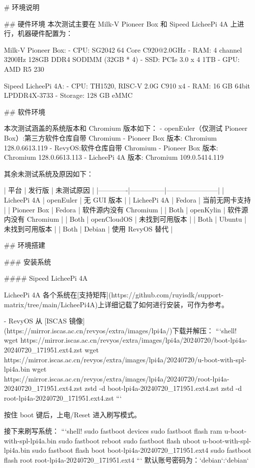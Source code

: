 \documentclass{article}
\begin{document}
\begin{markdown}
# 环境说明

## 硬件环境
本次测试主要在 Milk-V Pioneer Box 和 Sipeed LicheePi 4A 上进行，机器硬件配置为：

Milk-V Pioneer Box:
- CPU: SG2042 64 Core C920@2.0GHz
- RAM: 4 channel 3200Hz 128GB DDR4 SODIMM (32GB * 4)
- SSD: PCIe 3.0 x 4 1TB
- GPU: AMD R5 230

Sipeed LicheePi 4A:
- CPU: TH1520, RISC-V 2.0G C910 x4
- RAM: 16 GB 64bit LPDDR4X-3733
- Storage: 128 GB eMMC

## 软件环境

本次测试涵盖的系统版本和 Chromium 版本如下：
- openEuler（仅测试 Pioneer Box）:第三方软件仓库自带 Chromium 
  - Pioneer Box 版本: Chromium 128.0.6613.119
- RevyOS:软件仓库自带 Chromium
  - Pioneer Box 版本: Chromium 128.0.6613.113
  - LicheePi 4A 版本: Chromium 109.0.5414.119
  
其余未测试系统及原因如下：

| 平台        | 发行版        | 未测试原因              |
|-------------|---------------|-----------------------|
| LicheePi 4A | openEuler     | 无 GUI 版本           |
| LicheePi 4A | Fedora        | 当前无网卡支持        |
| Pioneer Box | Fedora        | 软件源内没有 Chromium |
| Both        | openKylin     | 软件源内没有 Chromium |
| Both        | openCloudOS   | 未找到可用版本        |
| Both        | Ubuntu        | 未找到可用版本        |
| Both        | Debian | 使用 RevyOS 替代      |

## 环境搭建

### 安装系统

#### Sipeed LicheePi 4A

LicheePi 4A 各个系统在[支持矩阵](https://github.com/ruyisdk/support-matrix/tree/main/LicheePi4A)上详细记载了如何进行安装，可作为参考。

- RevyOS
从 [ISCAS 镜像](https://mirror.iscas.ac.cn/revyos/extra/images/lpi4a/)下载并解压：
```shell!
wget https://mirror.iscas.ac.cn/revyos/extra/images/lpi4a/20240720/boot-lpi4a-20240720_171951.ext4.zst
wget https://mirror.iscas.ac.cn/revyos/extra/images/lpi4a/20240720/u-boot-with-spl-lpi4a.bin
wget https://mirror.iscas.ac.cn/revyos/extra/images/lpi4a/20240720/root-lpi4a-20240720_171951.ext4.zst
zstd -d boot-lpi4a-20240720_171951.ext4.zst
zstd -d root-lpi4a-20240720_171951.ext4.zst
```

按住 boot 键后，上电/Reset 进入刷写模式。

接下来刷写系统：
```shell!
sudo fastboot devices
sudo fastboot flash ram u-boot-with-spl-lpi4a.bin 
sudo fastboot reboot
sudo fastboot flash uboot u-boot-with-spl-lpi4a.bin
sudo fastboot flash boot boot-lpi4a-20240720_171951.ext4
sudo fastboot flash root root-lpi4a-20240720_171951.ext4
```
默认账号密码为：`debian`:`debian`


\end{markdown}
\end{document}
